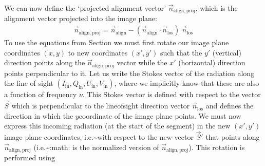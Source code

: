 \documentclass[letterpaper,10pt,english]{sphinxmanual}
\begin{document}
We can now define the ‘projected alignment vector’ \(\vec
n_{\mathrm{align,proj}}\), which is the alignment vector projected into
the image plane:
\begin{equation*}
\begin{split}\vec n_{\mathrm{align,proj}} = \vec n_{\mathrm{align}} - (\vec n_{\mathrm{align}}\cdot
\vec n_{\mathrm{los}})\;\vec n_{\mathrm{los}}\end{split}
\end{equation*}
To use the equations from Section {\hyperref[\detokenize{dustradtrans:sec-basic-equations}]{}} we must first
rotate our image plane coordinates \((x,y)\) to new coordinates \((x',y')\) such
that the \(y'\) (vertical) direction points along the \(\vec
n_{\mathrm{align,proj}}\) vector while the \(x'\) (horizontal) direction points
perpendicular to it. Let us write the Stokes vector of the radiation along
the line of sight
\((I_{\mathrm{in}},Q_{\mathrm{in}},U_{\mathrm{in}},V_{\mathrm{in}})\), where
we implicitly know that these are also a function of frequency \(\nu\). This
Stokes vector is defined with respect to the vector \(\vec S\) which is
perpendicular to the line\sphinxhyphen{}of\sphinxhyphen{}sight direction vector \(\vec n_{\mathrm{los}}\)
and defines the direction in which the \(y\)\sphinxhyphen{}coordinate of the image plane
points. We must now express this incoming radiation (at the start of the
segment) in the new \((x',y')\) image plane coordinates, i.e.\textasciitilde{}with respect to
the new vector \(\vec S'\) that points along \(\vec n_{\mathrm{align,proj}}\)
(i.e.\textasciitilde{}:math: is the normalized version of \(\vec
n_{\mathrm{align,proj}}\)). This rotation is performed using
\end{document}
